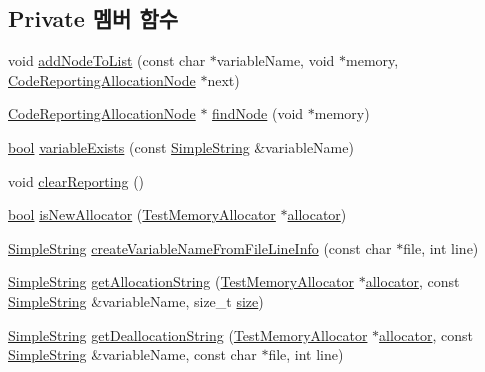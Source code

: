 \subsection*{Private 멤버 함수}
\begin{DoxyCompactItemize}
\item 
void \hyperlink{class_code_memory_report_formatter_a52af7af383a8ca9f00412be8cf31fb52}{add\+Node\+To\+List} (const char $\ast$variable\+Name, void $\ast$memory, \hyperlink{struct_code_reporting_allocation_node}{Code\+Reporting\+Allocation\+Node} $\ast$next)
\item 
\hyperlink{struct_code_reporting_allocation_node}{Code\+Reporting\+Allocation\+Node} $\ast$ \hyperlink{class_code_memory_report_formatter_ab3bdf37ad56ffc1f06245f495afad613}{find\+Node} (void $\ast$memory)
\item 
\hyperlink{avb__gptp_8h_af6a258d8f3ee5206d682d799316314b1}{bool} \hyperlink{class_code_memory_report_formatter_aebb4bb2cfdbdeca9666a6b426fc126cb}{variable\+Exists} (const \hyperlink{class_simple_string}{Simple\+String} \&variable\+Name)
\item 
void \hyperlink{class_code_memory_report_formatter_a8bdb7334ae0af7865a368903e7e9c3b3}{clear\+Reporting} ()
\item 
\hyperlink{avb__gptp_8h_af6a258d8f3ee5206d682d799316314b1}{bool} \hyperlink{class_code_memory_report_formatter_a33b96e0ded7b181daf75a9aab9a8f370}{is\+New\+Allocator} (\hyperlink{class_test_memory_allocator}{Test\+Memory\+Allocator} $\ast$\hyperlink{_memory_leak_warning_test_8cpp_a83fc2e9b9142613f7df2bcc3ff8292bc}{allocator})
\item 
\hyperlink{class_simple_string}{Simple\+String} \hyperlink{class_code_memory_report_formatter_a2501cae5156eeee3e38c94c5b0304240}{create\+Variable\+Name\+From\+File\+Line\+Info} (const char $\ast$file, int line)
\item 
\hyperlink{class_simple_string}{Simple\+String} \hyperlink{class_code_memory_report_formatter_a184180e6760987bc2c4acfd59ad34fa5}{get\+Allocation\+String} (\hyperlink{class_test_memory_allocator}{Test\+Memory\+Allocator} $\ast$\hyperlink{_memory_leak_warning_test_8cpp_a83fc2e9b9142613f7df2bcc3ff8292bc}{allocator}, const \hyperlink{class_simple_string}{Simple\+String} \&variable\+Name, size\+\_\+t \hyperlink{gst__avb__playbin_8c_a439227feff9d7f55384e8780cfc2eb82}{size})
\item 
\hyperlink{class_simple_string}{Simple\+String} \hyperlink{class_code_memory_report_formatter_a32fb96533a756602b0f707abdb20fe14}{get\+Deallocation\+String} (\hyperlink{class_test_memory_allocator}{Test\+Memory\+Allocator} $\ast$\hyperlink{_memory_leak_warning_test_8cpp_a83fc2e9b9142613f7df2bcc3ff8292bc}{allocator}, const \hyperlink{class_simple_string}{Simple\+String} \&variable\+Name, const char $\ast$file, int line)
\end{DoxyCompactItemize}
